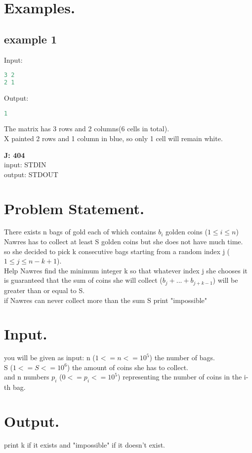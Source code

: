 \documentclass[10pt]{article}
\begin{document}
\section{Examples.}
\subsection{example 1}
Input:
\begin{lstlisting}[language=Python]
3 2
2 1
\end{lstlisting}
Output:
\begin{lstlisting}[language=Python]
1
\end{lstlisting}
The matrix has 3 rows and 2 columns(6 cells in total).\\
X painted 2 rows and 1 column in blue, so only 1 cell will remain white.
\newpage
\begin{center}
    \Huge { \textbf{J: 404}}\\
\normalsize  { input:  STDIN}\\
\normalsize{    output: STDOUT}
\end{center}
\section{Problem Statement.}
There exists n bags of gold each of which contains $b_i$ golden coins ($1 \le i \le
 n$) Nawres has to collect at least S golden coins but she does not have much
 time.\\
 so she decided to pick k consecutive bags starting from a random index j
 ($1 \le j \le n - k +1$).\\
 Help Nawres find the minimum integer k so that whatever index j she chooses it is guaranteed that the sum of coins she will collect ($b_j
 + ... + b_{j+k-1}$) will be greater than or equal to S.\\
 if Nawres can never collect more than the sum S print "impossible"
\section{Input.}
you will be given as input:
n ($1<=n<=10^5$) the number of bags.\\
S ($1<=S<=10^6$) the amount of coins she has to collect.\\
and n numbers $p_i$ ($0<=p_i<=10^5$) representing the number of coins in the i-th bag.
\section{Output.}
print k if it exists and "impossible" if it doesn't exist.
\end{document}
